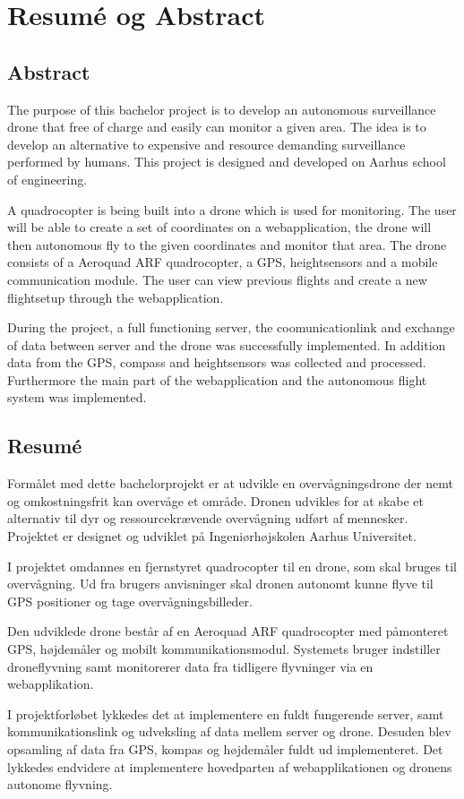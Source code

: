\chapter{Resumé og Abstract}
\label{chap:resume}


\section*{Abstract}


The purpose of this bachelor project is to develop an autonomous surveillance drone that free of charge and easily can monitor a given area. The idea is to develop an alternative to expensive and resource demanding surveillance performed by humans. This project is designed and developed on Aarhus school of engineering. 

A quadrocopter is being built into a drone which is used for monitoring. The user will be able to create a set of coordinates on a webapplication, the drone will then autonomous fly to the given coordinates and monitor that area. 
The drone consists of a Aeroquad ARF quadrocopter, a GPS, heightsensors and a mobile communication module. 
The user can view previous flights and create a new flightsetup through the webapplication.

During the project, a full functioning server, the coomunicationlink and exchange of data between server and the drone was successfully implemented. In addition data from the GPS, compass and heightsensors was collected and processed. Furthermore the main part of the webapplication and the autonomous flight system was implemented.




\section*{Resumé}

Formålet med dette bachelorprojekt er at udvikle en overvågningsdrone der nemt og omkostningsfrit kan overvåge et område. Dronen udvikles for at skabe et alternativ til dyr og ressourcekrævende overvågning udført af mennesker.
Projektet er designet og udviklet på Ingeniørhøjskolen Aarhus Universitet.

I projektet omdannes en fjernstyret quadrocopter til en drone, som skal bruges til overvågning. Ud fra brugers anvisninger skal dronen autonomt kunne flyve til GPS positioner og tage overvågningsbilleder.  

Den udviklede drone består af en Aeroquad ARF quadrocopter med påmonteret GPS, højdemåler og mobilt kommunikationsmodul. Systemets bruger indstiller droneflyvning samt monitorerer data fra tidligere flyvninger via en webapplikation.  

I projektforløbet lykkedes det at implementere en fuldt fungerende server, samt kommunikationslink og udveksling af data mellem server og drone. Desuden blev opsamling af data fra GPS, kompas og højdemåler fuldt ud implementeret. Det lykkedes endvidere at implementere hovedparten af webapplikationen og dronens autonome flyvning.





